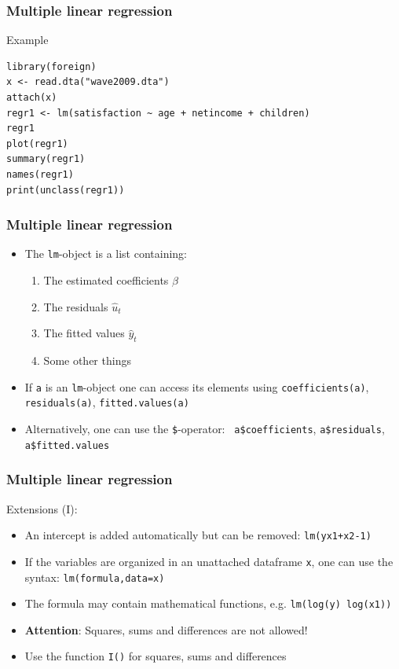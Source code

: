 \documentclass[xcolor={svgnames},10pt,
handout
]{beamer}
\begin{document}
\begin{frame}[fragile]
\frametitle{Multiple linear regression}
Example
\begin{lstlisting}
library(foreign)
x <- read.dta("wave2009.dta")
attach(x)
regr1 <- lm(satisfaction ~ age + netincome + children)
regr1
plot(regr1)
summary(regr1)
names(regr1)
print(unclass(regr1))
\end{lstlisting}
\end{frame}


\begin{frame}
\frametitle{Multiple linear regression}
\begin{itemize}
\item The \texttt{lm}-object is a list containing:
\begin{enumerate}
\item The estimated coefficients $\hat{\beta}$
\item The residuals $\hat{u}_{t}$
\item The fitted values $\hat{y}_{t}$
\item Some other things
\end{enumerate}
\item If \texttt{a} is an \texttt{lm}-object one can access its elements
using\newline
\texttt{coefficients(a)}, \texttt{residuals(a)}, \texttt{fitted.values(a)}
\item Alternatively, one can use the \texttt{\$}-operator: \texttt{%
a\$coefficients}, \texttt{a\$residuals}, \texttt{a\$fitted.values}
\end{itemize}
\end{frame}


\begin{frame}
\frametitle{Multiple linear regression}
Extensions (I):
\begin{itemize}
\item An intercept is added automatically but can be removed: \texttt{lm(yx1+x2-1)}
\item If the variables are organized in an unattached dataframe \texttt{x}, 
\newline
one can use the syntax: \texttt{lm(formula,data=x)}
\item The formula may contain mathematical functions, e.g. \texttt{lm(log(y)%
log(x1))}
\item \textbf{Attention}: Squares, sums and differences are not allowed!
\item Use the function \texttt{I()} for squares, sums and differences
\end{itemize}
\end{frame}
\end{document}
